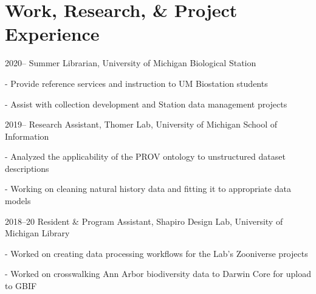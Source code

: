 \documentclass[12pt,letterpaper]{report}
\newcommand{\listitemspace}{0.25em}
\renewenvironment{itemize}
{\begin{list}{}{\setlength{\leftmargin}{0em}
            \setlength{\parskip}{0em}
            \setlength{\itemsep}{\listitemspace}
            \setlength{\parsep}{\listitemspace}}}
{\end{list}}
\begin{document}
\section*{Work, Research, \& Project Experience}

\begin{tablist}
    
	\item[2020--] \tab Summer Librarian, University of Michigan Biological Station

	\begin{itemize} \begin{footnotesize}

		\item - Provide reference services and instruction to UM Biostation students

		\item - Assist with collection development and Station data management projects

	\end{footnotesize} \end{itemize}
    
	\item[2019--] \tab Research Assistant, Thomer Lab, University of Michigan School of Information

	\begin{itemize} \begin{footnotesize}

		\item - Analyzed the applicability of the PROV ontology to unstructured dataset descriptions

		\item - Working on cleaning natural history data and fitting it to appropriate data models

	\end{footnotesize} \end{itemize}
        
	\item[2018--20] \tab Resident \& Program Assistant, Shapiro Design Lab, University of Michigan Library

	\begin{itemize} \begin{footnotesize}

		\item - Worked on creating data processing workflows for the Lab’s Zooniverse projects 

		\item - Worked on crosswalking Ann Arbor biodiversity data to Darwin Core for upload to GBIF


\end{footnotesize}
\end{itemize}
\end{tablist}
\end{document}
